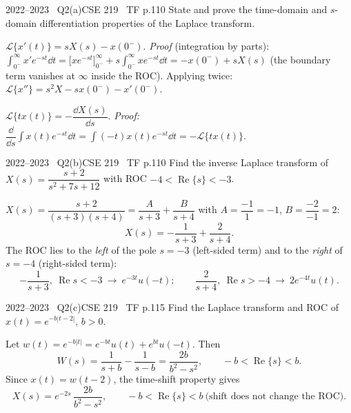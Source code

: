 \begin{qcard}{2022--2023 \textbullet\ Q2(a)}{CSE 219 \textbullet\ TF p.1}{10}
State and prove the time-domain and $s$-domain differentiation properties of the Laplace transform.
\end{qcard}
\begin{solution}
 $\mathcal L\{x'(t)\}=sX(s)-x(0^-)$.
\emph{Proof} (integration by parts): $\displaystyle\int_{0^-}^\infty x'e^{-st}\dd t=\Big[x e^{-st}\Big]_{0^-}^\infty+s\int_{0^-}^\infty xe^{-st}\dd t=-x(0^-)+sX(s)$ (the boundary term vanishes at $\infty$ inside the ROC). Applying twice: $\mathcal L\{x''\}=s^2X-sx(0^-)-x'(0^-)$.

 $\mathcal L\{tx(t)\}=-\dfrac{\dd X(s)}{\dd s}$.
\emph{Proof:} $\dfrac{\dd}{\dd s}\displaystyle\int x(t)e^{-st}\dd t=\int(-t)x(t)e^{-st}\dd t=-\mathcal L\{tx(t)\}$.
\end{solution}

\begin{qcard}{2022--2023 \textbullet\ Q2(b)}{CSE 219 \textbullet\ TF p.1}{10}
Find the inverse Laplace transform of $X(s)=\dfrac{s+2}{s^2+7s+12}$ with ROC $-4<\operatorname{Re}\{s\}<-3$.
\end{qcard}
\begin{solution}
$X(s)=\dfrac{s+2}{(s+3)(s+4)}=\dfrac{A}{s+3}+\dfrac B{s+4}$ with $A=\dfrac{-1}{1}=-1$, $B=\dfrac{-2}{-1}=2$:
\[X(s)=-\frac1{s+3}+\frac2{s+4}.\]
The ROC lies to the \emph{left} of the pole $s=-3$ (left-sided term) and to the \emph{right} of $s=-4$ (right-sided term):
\[-\frac1{s+3},\ \operatorname{Re}s<-3\ \longrightarrow\ e^{-3t}u(-t);\qquad\frac2{s+4},\ \operatorname{Re}s>-4\ \longrightarrow\ 2e^{-4t}u(t).\]
\end{solution}

\begin{qcard}{2022--2023 \textbullet\ Q2(c)}{CSE 219 \textbullet\ TF p.1}{15}
Find the Laplace transform and ROC of $x(t)=e^{-b|t-2|}$, $b>0$.
\end{qcard}
\begin{solution}
Let $w(t)=e^{-b|t|}=e^{-bt}u(t)+e^{bt}u(-t)$. Then
\[W(s)=\frac1{s+b}-\frac1{s-b}=\frac{2b}{b^2-s^2},\qquad -b<\operatorname{Re}\{s\}<b .\]
Since $x(t)=w(t-2)$, the time-shift property gives
\[X(s)=e^{-2s}\,\frac{2b}{b^2-s^2},\qquad -b<\operatorname{Re}\{s\}<b\ \text{(shift does not change the ROC)}.\]
\end{solution}

